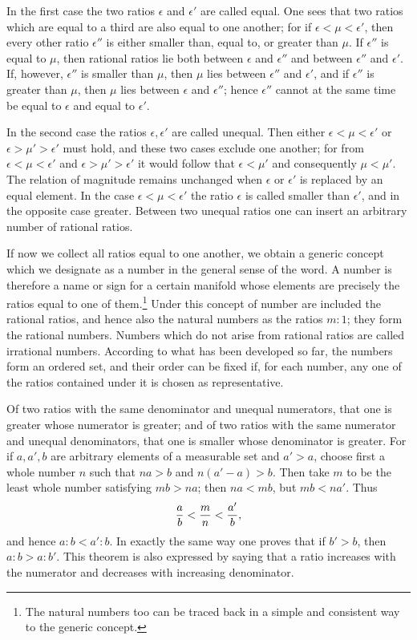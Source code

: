 \documentclass[11pt]{article}
\begin{document}
In the first case the two ratios $\epsilon$ and $\epsilon'$ are called equal. One sees that two ratios which are equal to a third are also equal to one another; for if $\epsilon<\mu<\epsilon'$, then every other ratio $\epsilon''$ is either smaller than, equal to, or greater than $\mu$. If $\epsilon''$ is equal to $\mu$, then rational ratios lie both between $\epsilon$ and $\epsilon''$ and between $\epsilon''$ and $\epsilon'$. If, however, $\epsilon''$ is smaller than $\mu$, then $\mu$ lies between $\epsilon''$ and $\epsilon'$, and if $\epsilon''$ is greater than $\mu$, then $\mu$ lies between $\epsilon$ and $\epsilon''$; hence $\epsilon''$ cannot at the same time be equal to $\epsilon$ and equal to $\epsilon'$.

In the second case the ratios $\epsilon,\epsilon'$ are called unequal. Then either $\epsilon<\mu<\epsilon'$ or $\epsilon>\mu'>\epsilon'$ must hold, and these two cases exclude one another; for from $\epsilon<\mu<\epsilon'$ and $\epsilon>\mu'>\epsilon'$ it would follow that $\epsilon<\mu'$ and consequently $\mu<\mu'$. The relation of magnitude remains unchanged when $\epsilon$ or $\epsilon'$ is replaced by an equal element. In the case $\epsilon<\mu<\epsilon'$ the ratio $\epsilon$ is called smaller than $\epsilon'$, and in the opposite case greater. Between two unequal ratios one can insert an arbitrary number of rational ratios.

If now we collect all ratios equal to one another, we obtain a generic concept which we designate as a number in the general sense of the word. A number is therefore a name or sign for a certain manifold whose elements are precisely the ratios equal to one of them.\footnote{The natural numbers too can be traced back in a simple and consistent way to the generic concept.} Under this concept of number are included the rational ratios, and hence also the natural numbers as the ratios $m:1$; they form the rational numbers. Numbers which do not arise from rational ratios are called irrational numbers. According to what has been developed so far, the numbers form an ordered set, and their order can be fixed if, for each number, any one of the ratios contained under it is chosen as representative.

Of two ratios with the same denominator and unequal numerators, that one is greater whose numerator is greater; and of two ratios with the same numerator and unequal denominators, that one is smaller whose denominator is greater. For if $a,a',b$ are arbitrary elements of a measurable set and $a'>a$, choose first a whole number $n$ such that $na>b$ and $n(a'-a)>b$. Then take $m$ to be the least whole number satisfying $mb>na$; then $na<mb$, but $mb<na'$. Thus
\[
 {a\over b}<{m\over n}<{a'
\over b},
\]
and hence $a:b<a':b$. In exactly the same way one proves that if $b'>b$, then $a:b>a:b'$. This theorem is also expressed by saying that a ratio increases with the numerator and decreases with increasing denominator.
\end{document}
